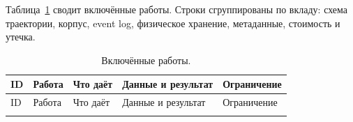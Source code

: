 \documentclass[11pt,a4paper]{article}
\begin{document}
Таблица~\ref{tab:sources} сводит включённые работы. Строки сгруппированы
по вкладу: схема траектории, корпус, event log, физическое хранение,
метаданные, стоимость и утечка.

{\scriptsize
\setlength{\tabcolsep}{3pt}
\renewcommand{\arraystretch}{1.12}
\begin{longtable}{@{}>{\raggedright\arraybackslash}p{0.55cm}>{\raggedright\arraybackslash}p{3.0cm}>{\raggedright\arraybackslash}p{2.7cm}>{\raggedright\arraybackslash}p{4.3cm}>{\raggedright\arraybackslash}p{3.0cm}@{}}
\caption{Включённые работы.}\label{tab:sources}\\
\toprule
ID & Работа & Что даёт & Данные и результат & Ограничение \\
\midrule
\endfirsthead
\toprule
ID & Работа & Что даёт & Данные и результат & Ограничение \\
\midrule
\endhead
\bottomrule
\endfoot


\end{longtable}}
\end{document}
